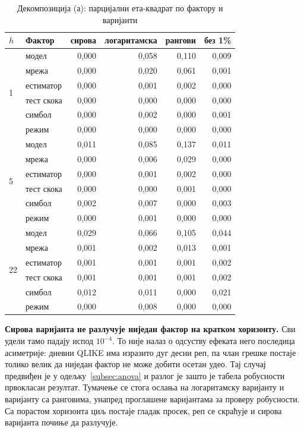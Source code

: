 \begin{table}[htbp]
\centering
\caption{Декомпозиција (а): парцијални ета-квадрат по фактору и варијанти}
\label{tab:anova-a}
\small
\begin{tabular}{llrrrr}
\toprule
$h$ & Фактор & сирова & логаритамска & рангови & без 1\% \\
\midrule
\multirow{6}{*}{1}
& модел                  & 0,000 & 0,058 & 0,110 & 0,009 \\
& мрежа                  & 0,000 & 0,020 & 0,061 & 0,001 \\
& естиматор              & 0,000 & 0,001 & 0,002 & 0,000 \\
& тест скока             & 0,000 & 0,000 & 0,000 & 0,000 \\
& симбол                 & 0,000 & 0,002 & 0,000 & 0,001 \\
& режим                  & 0,000 & 0,000 & 0,000 & 0,000 \\
\midrule
\multirow{6}{*}{5}
& модел                  & 0,011 & 0,085 & 0,137 & 0,011 \\
& мрежа                  & 0,000 & 0,006 & 0,029 & 0,000 \\
& естиматор              & 0,000 & 0,001 & 0,002 & 0,000 \\
& тест скока             & 0,000 & 0,000 & 0,001 & 0,000 \\
& симбол                 & 0,002 & 0,007 & 0,000 & 0,003 \\
& режим                  & 0,000 & 0,001 & 0,000 & 0,000 \\
\midrule
\multirow{6}{*}{22}
& модел                  & 0,029 & 0,066 & 0,105 & 0,044 \\
& мрежа                  & 0,001 & 0,002 & 0,013 & 0,001 \\
& естиматор              & 0,001 & 0,001 & 0,001 & 0,002 \\
& тест скока             & 0,001 & 0,001 & 0,001 & 0,002 \\
& симбол                 & 0,012 & 0,011 & 0,000 & 0,021 \\
& режим                  & 0,000 & 0,008 & 0,000 & 0,000 \\
\bottomrule
\end{tabular}
\end{table}

\textbf{Сирова варијанта не разлучује ниједан фактор на кратком хоризонту.} Сви удели
тамо падају испод $10^{-4}$. То није налаз о одсуству ефеката него последица асиметрије:
дневни QLIKE има изразито дуг десни реп, па члан грешке постаје толико велик да ниједан
фактор не може добити осетан удео. Тај случај предвиђен је у одељку~\ref{subsec:anova} и
разлог је зашто је табела робусности првокласан резултат. Тумачење се стога ослања на
логаритамску варијанту и варијанту са ранговима, унапред проглашене варијантама за
проверу робусности. Са порастом хоризонта циљ постаје гладак просек, реп се скраћује и
сирова варијанта почиње да разлучује.

